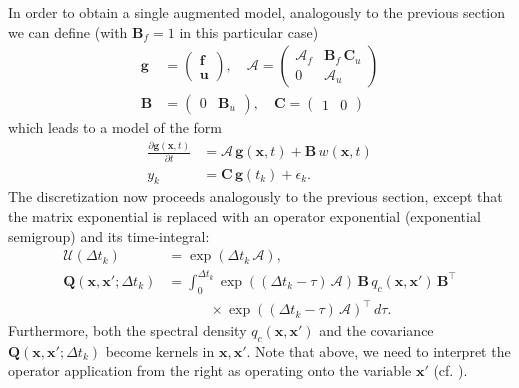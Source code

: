 \documentclass[journal]{IEEEtran}
\begin{document}
In order to obtain a single augmented model, analogously to the previous section we can define (with $\mathbf{B}_f = 1$ in this particular case)
%
\begin{equation}
\begin{split}
  \mathbf{g} &= \begin{pmatrix}
	\mathbf{f} \\ \mathbf{u}
  \end{pmatrix}, \quad
  \mathbf{\mathcal{A}}
  = \begin{pmatrix}
	\mathbf{\mathcal{A}}_f & \mathbf{B}_f \, \mathbf{C}_u \\
	0 & \mathbf{\mathcal{A}}_u
  \end{pmatrix} \\
  \mathbf{B}
  &= \begin{pmatrix}
	0 & \mathbf{B}_u
  \end{pmatrix}, \quad
  \mathbf{C}
  = \begin{pmatrix}
	1 & 0
  \end{pmatrix}
\end{split}
\end{equation}
%
which leads to a model of the form
%
\begin{equation}
\begin{split}
  \frac{\partial \mathbf{g}(\mathbf{x},t)}{\partial t}
  &= \mathbf{\mathcal{A}} \, \mathbf{g}(\mathbf{x},t)
  + \mathbf{B} \, w(\mathbf{x},t) \\
  y_k &= \mathbf{C} \, \mathbf{g}(t_k) + \epsilon_k.
\end{split}
\label{eq:ssaug2}
\end{equation}
%
The discretization now proceeds analogously to the previous section, except that the matrix exponential is replaced with an operator exponential (exponential semigroup) and its time-integral:
%
\begin{equation}
\begin{split}
  \mathbf{\mathcal{U}}(\Delta t_k)  &= \exp(\Delta t_k \, \mathbf{\mathcal{A}}), \\
  \mathbf{Q}(\mathbf{x},\mathbf{x}';\Delta t_k) &= \int_0^{\Delta t_k} \exp((\Delta t_k - \tau) \, 
  \mathbf{\mathcal{A}}) \,
  \mathbf{B} \, q_c(\mathbf{x},\mathbf{x}')  \, \mathbf{B}^{\top} \\
  &\qquad \quad \times \exp((\Delta t_k - \tau) \, \mathbf{\mathcal{A}})^{\top} \, d\tau.
\end{split}
\label{eq:dssaug}
\end{equation}
%
Furthermore, both the spectral density $q_c(\mathbf{x},\mathbf{x}')$ and the covariance $\mathbf{Q}(\mathbf{x},\mathbf{x}';\Delta t_k)$ become kernels in $\mathbf{x},\mathbf{x}'$. Note that above, we need to interpret the operator application from the right as operating onto the variable $\mathbf{x}'$ (cf. \cite{Sarkka+Hartikainen:2012}).
\end{document}
